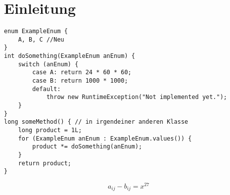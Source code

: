 \chapter{Einleitung}
\label{sec:Einleitung}

\blindtext

\begin{lstlisting}[caption={Fehler durch Änderung in der Nachbarschaft.}, label={lst:newenum}]
enum ExampleEnum {
    A, B, C //Neu
}
int doSomething(ExampleEnum anEnum) {
    switch (anEnum) {
        case A: return 24 * 60 * 60;
        case B: return 1000 * 1000;
        default:
            throw new RuntimeException("Not implemented yet.");
    }
}
long someMethod() { // in irgendeiner anderen Klasse
    long product = 1L;
    for (ExampleEnum anEnum : ExampleEnum.values()) {
        product *= doSomething(anEnum);
    }
    return product;
}
\end{lstlisting}

\blindtext


\begin{displaymath}
a_{ i j } - b_{ i j } = x^{27}
\end{displaymath}